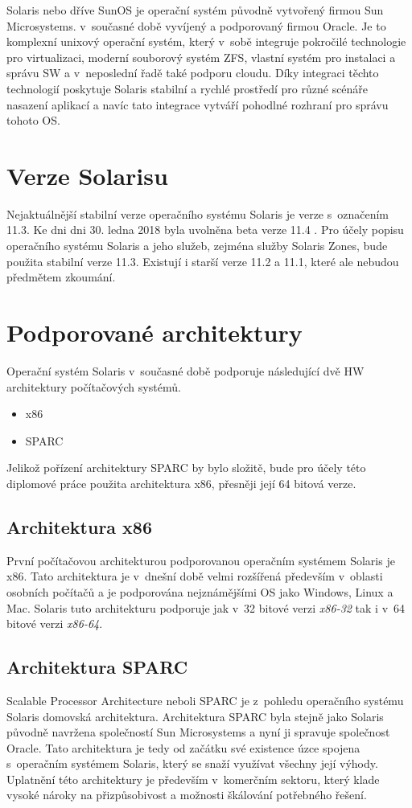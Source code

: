 \label{chapter:solaris}
Solaris nebo dříve SunOS je operační systém původně vytvořený firmou Sun Microsystems. v~současné době vyvíjený a podporovaný
firmou Oracle. Je to komplexní unixový operační systém, který v~sobě integruje pokročilé technologie pro virtualizaci, moderní
souborový systém ZFS, vlastní systém pro instalaci a správu SW a v~neposlední řadě také podporu cloudu. Díky integraci těchto
technologií poskytuje Solaris stabilní a rychlé prostředí pro různé scénáře nasazení aplikací a navíc tato integrace vytváří
pohodlné rozhraní pro správu tohoto OS. 
\section{Verze Solarisu}
\label{chapter:solaris:version}
Nejaktuálnější stabilní verze operačního systému Solaris je verze s~označením 11.3. Ke dni dni 30. ledna 2018 byla uvolněna beta
verze 11.4 \cite{solaris:beta_release}. Pro účely popisu operačního systému Solaris a jeho služeb, zejména služby Solaris Zones,
bude použita stabilní verze 11.3. Existují i starší verze 11.2 a 11.1, které ale nebudou předmětem zkoumání.
\section{Podporované architektury}
\label{chapter:solaris:support}
Operační systém Solaris v~současné době podporuje následující dvě HW architektury počítačových systémů.
\begin{itemize}
 \item x86
 \item SPARC
\end{itemize}
Jelikož pořízení architektury SPARC by bylo složitě, bude pro účely této diplomové práce použita architektura x86, přesněji
její 64 bitová verze.
\subsection{Architektura x86}
\label{chapter:solaris:support:x86}
První počítačovou architekturou podporovanou operačním systémem Solaris je x86. Tato architektura je v~dnešní době velmi rozšířená
především v~oblasti osobních počítačů a je podporována nejznámějšími OS jako Windows, Linux a Mac. Solaris tuto architekturu
podporuje jak v~32 bitové verzi \textit{x86-32} tak i v~64 bitové verzi \textit{x86-64}.
\subsection{Architektura SPARC}
\label{chapter:solaris:support:sparc}
Scalable Processor Architecture neboli SPARC je z~pohledu operačního systému Solaris domovská architektura. Architektura SPARC
byla stejně jako Solaris původně navržena společností Sun Microsystems a nyní ji spravuje společnost Oracle. Tato architektura
je tedy od začátku své existence úzce spojena s~operačním systémem Solaris, který se snaží využívat všechny její výhody.
Uplatnění této architektury je především v~komerčním sektoru, který klade vysoké nároky na přizpůsobivost a možnosti škálování
potřebného řešení.
